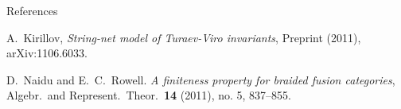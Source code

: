 \documentclass[final,t, mathserif]{beamer}
\theoremstyle{plain}
\theoremstyle{definition}
\begin{document}
\begin{frame}{}
\begin{columns}[t]
\begin{column}{.3\linewidth}
\begin{block}{References}
{\begin{thebibliography}{0}
 A.\ Kirillov, \emph{String-net model of {Turaev-Viro} invariants}, Preprint (2011), arXiv:1106.6033.


 D.\ Naidu and E.\ C.\ Rowell. \emph{A finiteness property for braided fusion categories}, Algebr.\ and Represent.\ Theor.\ \textbf{14} (2011), no. 5, 837--855.

\end{thebibliography}
}

\end{block}


\end{column}
\end{columns}
\end{frame}
\end{document}
